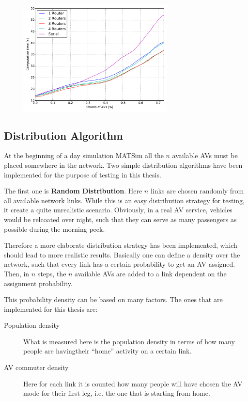 \begin{figure}
    \centering
    \includegraphics[width=0.7\textwidth]{figures/routers.pdf}
    \caption{}
    \label{fig:routers}
\end{figure}

\subsection{Distribution Algorithm}

At the beginning of a day simulation MATSim all the $n$ available AVs must be placed
somewhere in the network. Two simple distribution algorithms have been implemented
for the purpose of testing in this thesis.

The first one is \textbf{Random Distribution}. Here $n$ links are chosen randomly
from all available network links. While this is an easy distribution strategy for testing,
it create a quite unrealistic scenario. Obviously, in a real AV service, vehicles
would be relcoated over night, such that they can serve as many passengers as
possible during the morning peek.

Therefore a more elaborate distribution strategy has been implemented, which should
lead to more realistic results. Basically one can define a density over the network,
such that every link has a certain probability to get an AV assigned. Then, in $n$
steps, the $n$ available AVs are added to a link dependent on the assignment
probability.

This probability density can be based on many factors. The ones that are implemented
for this thesis are:

\begin{description}
\item[Population density] What is measured here is the population density in terms of
how many people are havingtheir ``home'' activity on a certain link.
\item[AV commuter density] Here for each link it is counted how many people will
have chosen the AV mode for their first leg, i.e. the one that is starting from home.
\end{description}

